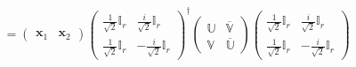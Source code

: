 \documentclass[aps, preprint]{revtex4}
\begin{document}
\begin{align*}
 &  =\left (\begin{array}{cc}\mathbf{x}_{1} & \mathbf{x}_{2}\end{array}\right ) \left (\begin{array}{cc}\frac{1}{\sqrt{2}} \mathbb{I}_{r} & \frac{i}{\sqrt{2}} \mathbb{I}_{r} \\
\frac{1}{\sqrt{2}} \mathbb{I}_{r} &  -\frac{i}{\sqrt{2}} \mathbb{I}_{r}\end{array}\right )^{ \dag } \left (\begin{array}{cc}\mathbb{U} & \overline{\mathbb{V}} \\
\mathbb{V} & \overline{\mathbb{U}}\end{array}\right ) \left (\begin{array}{cc}\frac{1}{\sqrt{2}} \mathbb{I}_{r} & \frac{i}{\sqrt{2}} \mathbb{I}_{r} \\
\frac{1}{\sqrt{2}} \mathbb{I}_{r} &  -\frac{i}{\sqrt{2}} \mathbb{I}_{r}\end{array}\right )\end{align*}
\end{document}
